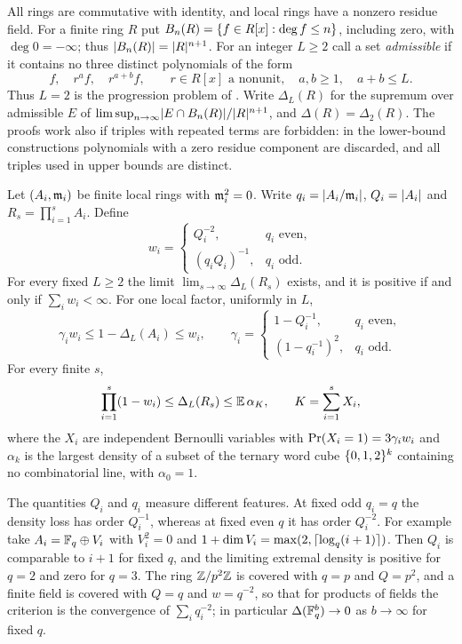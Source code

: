 All rings are commutative with identity, and local rings have a nonzero residue field. For
a finite ring $R$ put $B_n(R)=\{f\in R[x]:\deg f\le n\}$, including zero, with
$\deg0=-\infty$; thus $\lvert B_n(R)\rvert=\lvert R\rvert^{n+1}$. For an integer $L\ge2$ call a set
\emph{admissible} if it contains no three distinct polynomials of the form
\begin{equation}\label{gpp:eq:pattern}
 f,\quad r^af,\quad r^{a+b}f,\qquad
 r\in R[x]\text{ a nonunit},\quad a,b\ge1,\quad a+b\le L .
\end{equation}
Thus $L=2$ is the progression problem of \cite{Asada2017Subsets}. Write $\Delta_L(R)$ for
the supremum over admissible $E$ of $\limsup_{n\to\infty}\lvert E\cap B_n(R)\rvert/\lvert R\rvert^{n+1}$,
and $\Delta(R)=\Delta_2(R)$. The proofs work also if triples with repeated terms are
forbidden: in the lower-bound constructions polynomials with a zero residue component are
discarded, and all triples used in upper bounds are distinct.

\begin{theorem}\label{gpp:thm:local}
Let $(A_i,\mathfrak{m}_i)$ be finite local rings with $\mathfrak{m}_i^2=0$. Write
$q_i=\lvert A_i/\mathfrak{m}_i\rvert$, $Q_i=\lvert A_i\rvert$ and $R_s=\prod_{i=1}^sA_i$. Define
\[
 w_i=\begin{cases}Q_i^{-2},&q_i\text{ even},\\(q_iQ_i)^{-1},&q_i\text{ odd}.\end{cases}
\]
For every fixed $L\ge2$ the limit $\lim_{s\to\infty}\Delta_L(R_s)$ exists, and it is
positive if and only if $\sum_iw_i<\infty$. For one local factor, uniformly in $L$,
\[
 \gamma_iw_i\le1-\Delta_L(A_i)\le w_i,\qquad
 \gamma_i=\begin{cases}1-Q_i^{-1},&q_i\text{ even},\\(1-q_i^{-1})^2,&q_i\text{ odd}.\end{cases}
\]
For every finite $s$,
\begin{equation}\label{gpp:eq:productbound}
 \prod_{i=1}^s(1-w_i)\le\Delta_L(R_s)\le\mathbb{E}\,\alpha_K,\qquad
 K=\sum_{i=1}^sX_i,
\end{equation}
where the $X_i$ are independent Bernoulli variables with $\operatorname{Pr}(X_i=1)=3\gamma_iw_i$ and
$\alpha_k$ is the largest density of a subset of the ternary word cube $\{0,1,2\}^k$
containing no combinatorial line, with $\alpha_0=1$.
\end{theorem}

The quantities $Q_i$ and $q_i$ measure different features. At fixed odd $q_i=q$ the
density loss has order $Q_i^{-1}$, whereas at fixed even $q$ it has order $Q_i^{-2}$. For
example take $A_i=\mathbb{F}_q\oplus V_i$ with $V_i^2=0$ and
$1+\dim V_i=\max(2,\lceil\log_q(i+1)\rceil)$. Then $Q_i$ is comparable to $i+1$ for fixed $q$,
and the limiting extremal density is positive for $q=2$ and zero for $q=3$. The ring
$\mathbb{Z}/p^2\mathbb{Z}$ is covered with $q=p$ and $Q=p^2$, and a finite field is covered with $Q=q$
and $w=q^{-2}$, so that for products of fields the criterion is the convergence of
$\sum_iq_i^{-2}$; in particular $\Delta(\mathbb{F}_q^b)\to0$ as $b\to\infty$ for fixed $q$.

